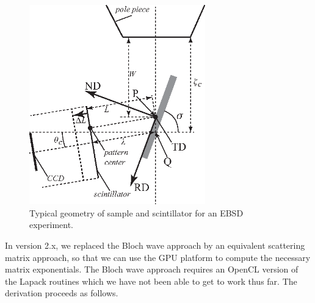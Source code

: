 \documentclass[DIV=calc, paper=letter, fontsize=11pt]{scrartcl}	 %
\begin{document}
\begin{figure}[t]
\centering
\includegraphics[width=3in]{figs/geometry}
\caption{Typical geometry of sample and scintillator for an EBSD experiment.} \label{fig:geometry}
\end{figure}

In version 2.x, we replaced the Bloch wave approach by an equivalent scattering matrix approach, so that we can use the GPU platform
to compute the necessary matrix exponentials.  The Bloch wave approach requires an OpenCL version of the Lapack routines
which we have not been able to get to work thus far.  The derivation proceeds as follows.
\end{document}
